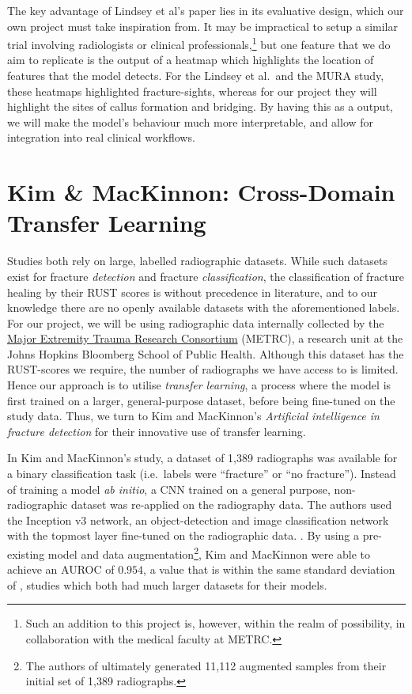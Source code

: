 The key advantage of Lindsey et al's paper lies in its evaluative design, which our own project must take inspiration from. It may be impractical to setup a similar trial involving radiologists or clinical professionals,\footnote{Such an addition to this project is, however, within the realm of possibility, in collaboration with the medical faculty at METRC.} but one feature that we do aim to replicate is the output of a heatmap which highlights the location of features that the model detects. For the Lindsey et al.~and the MURA study, these heatmaps highlighted fracture-sights, whereas for our project they will highlight the sites of callus formation and bridging. By having this as a output, we will make the model's behaviour much more interpretable, and allow for integration into real clinical workflows.

\section{Kim \& MacKinnon: Cross-Domain Transfer Learning}

  

Studies \autocites{MURA2017}{Lindsey2018} both rely on large, labelled radiographic datasets. While such datasets exist for fracture \emph{detection} and fracture 
\emph{classification}, the classification of fracture healing by their RUST scores is without precedence in literature, and to our knowledge there are no openly available datasets with the aforementioned labels. For our project, we will be using radiographic data internally collected by the \href{https://www.metrc.org/}{Major Extremity Trauma Research Consortium} (METRC), a research unit at the Johns Hopkins Bloomberg School of Public Health. Although this dataset has the RUST-scores we require, the number of radiographs we have access to is limited. Hence our approach is to utilise \emph{transfer learning}, a process where the model is first trained on a larger, general-purpose dataset, before being fine-tuned on the study data. Thus, we turn to Kim and MacKinnon's \emph{Artificial intelligence in fracture detection} for their innovative use of transfer learning.~\autocite{Kim2018}

In Kim and MacKinnon's study, a dataset of 1,389 radiographs was available for a binary classification task (i.e.~labels were \enquote{fracture} or \enquote{no fracture}). Instead of training a model \emph{ab initio}, a CNN trained on a general purpose, non-radiographic dataset was re-applied on the radiography data. The authors used the Inception v3 network, an object-detection and image classification network  \autocite{Szegedy2016} with the topmost layer fine-tuned on the radiographic data. \autocite{Kim2018}. By using a pre-existing model and data augmentation\footnote{The authors of \autocite{Kim2018} ultimately generated 11,112 augmented samples from their initial set of 1,389 radiographs.}, Kim and MacKinnon were able to achieve an  AUROC of $0.954$, a value that is within the same standard deviation of \autocites{MURA2017}{Lindsey2018}, studies which both had much larger datasets for their models.

